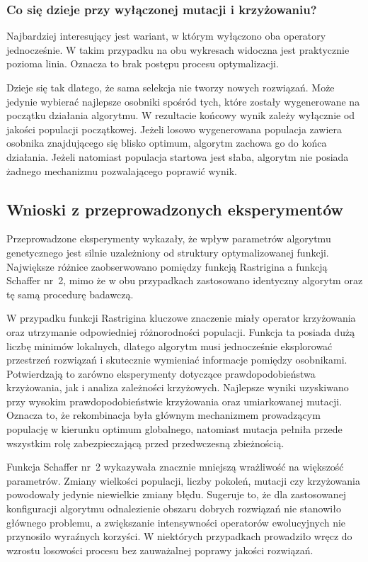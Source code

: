 \documentclass[a4paper,12pt]{article}
\begin{document}
\subsubsection*{Co się dzieje przy wyłączonej mutacji i krzyżowaniu?}

Najbardziej interesujący jest wariant, w którym wyłączono oba operatory jednocześnie. W takim przypadku na obu wykresach widoczna jest praktycznie pozioma linia. Oznacza to brak postępu procesu optymalizacji.

Dzieje się tak dlatego, że sama selekcja nie tworzy nowych rozwiązań. Może jedynie wybierać najlepsze osobniki spośród tych, które zostały wygenerowane na początku działania algorytmu. W rezultacie końcowy wynik zależy wyłącznie od jakości populacji początkowej. Jeżeli losowo wygenerowana populacja zawiera osobnika znajdującego się blisko optimum, algorytm zachowa go do końca działania. Jeżeli natomiast populacja startowa jest słaba, algorytm nie posiada żadnego mechanizmu pozwalającego poprawić wynik.

\subsection{Wnioski z przeprowadzonych eksperymentów}

Przeprowadzone eksperymenty wykazały, że wpływ parametrów algorytmu genetycznego jest silnie uzależniony od struktury optymalizowanej funkcji. Największe różnice zaobserwowano pomiędzy funkcją Rastrigina a funkcją Schaffer nr~2, mimo że w obu przypadkach zastosowano identyczny algorytm oraz tę samą procedurę badawczą.

W przypadku funkcji Rastrigina kluczowe znaczenie miały operator krzyżowania oraz utrzymanie odpowiedniej różnorodności populacji. Funkcja ta posiada dużą liczbę minimów lokalnych, dlatego algorytm musi jednocześnie eksplorować przestrzeń rozwiązań i skutecznie wymieniać informacje pomiędzy osobnikami. Potwierdzają to zarówno eksperymenty dotyczące prawdopodobieństwa krzyżowania, jak i analiza zależności krzyżowych. Najlepsze wyniki uzyskiwano przy wysokim prawdopodobieństwie krzyżowania oraz umiarkowanej mutacji. Oznacza to, że rekombinacja była głównym mechanizmem prowadzącym populację w kierunku optimum globalnego, natomiast mutacja pełniła przede wszystkim rolę zabezpieczającą przed przedwczesną zbieżnością.

Funkcja Schaffer nr~2 wykazywała znacznie mniejszą wrażliwość na większość parametrów. Zmiany wielkości populacji, liczby pokoleń, mutacji czy krzyżowania powodowały jedynie niewielkie zmiany błędu. Sugeruje to, że dla zastosowanej konfiguracji algorytmu odnalezienie obszaru dobrych rozwiązań nie stanowiło głównego problemu, a zwiększanie intensywności operatorów ewolucyjnych nie przynosiło wyraźnych korzyści. W niektórych przypadkach prowadziło wręcz do wzrostu losowości procesu bez zauważalnej poprawy jakości rozwiązań.
\end{document}
